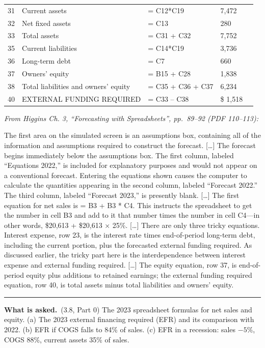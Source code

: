 \documentclass[11pt,a4paper]{article}
\newcommand{\asked}{\par\medskip\noindent\textbf{What is asked.}~}
\newcommand{\stmtend}{\par\endgroup\nopagebreak\noindent\rule{\linewidth}{0.4pt}\par\medskip}
\begin{document}
{\begin{longtable}[]{@{}lllll@{}}
31 & Current assets & = C12*C19 & 7,472 & \\
32 & Net fixed assets & = C13 & 280 & \\
33 & Total assets & = C31 + C32 & 7,752 & \\
35 & Current liabilities & = C14*C19 & 3,736 & \\
36 & Long-term debt & = C7 & 660 & \\
37 & Owners' equity & = B15 + C28 & 1,838 & \\
38 & Total liabilities and owners' equity & = C35 + C36 + C37 & 6,234 & \\
40 & EXTERNAL FUNDING REQUIRED & = C33 -- C38 & \$ 1,518 & \\
\end{longtable}
}

\emph{From Higgins Ch. 3, ``Forecasting with Spreadsheets'', pp.~89--92 (PDF 110--113):}

The first area on the simulated screen is an assumptions box, containing all of the information and
assumptions required to construct the forecast. {[}\ldots{]} The forecast begins immediately below
the assumptions box. The first column, labeled ``Equations 2022,'' is included for explanatory
purposes and would not appear on a conventional forecast. Entering the equations shown causes the
computer to calculate the quantities appearing in the second column, labeled ``Forecast 2022.'' The
third column, labeled ``Forecast 2023,'' is presently blank. {[}\ldots{]} The first equation for net
sales is = B3 + B3 * C4. This instructs the spreadsheet to get the number in cell B3 and add to it
that number times the number in cell C4---in other words, \$20,613 + \$20,613 × 25\%. {[}\ldots{]}
There are only three tricky equations. Interest expense, row 23, is the interest rate times
end-of-period long-term debt, including the current portion, plus the forecasted external funding
required. As discussed earlier, the tricky part here is the interdependence between interest expense
and external funding required. {[}\ldots{]} The equity equation, row 37, is end-of-period equity
plus additions to retained earnings; the external funding required equation, row 40, is total assets
minus total liabilities and owners' equity.
\stmtend

\asked (3.8, Part 0) The 2023 spreadsheet formulas for net sales and equity. (a) The 2023 external
financing required (EFR) and its comparison with 2022. (b) EFR if COGS falls to 84\% of sales.
(c) EFR in a recession: sales $-5\%$, COGS 88\%, current assets 35\% of sales.
\end{document}
